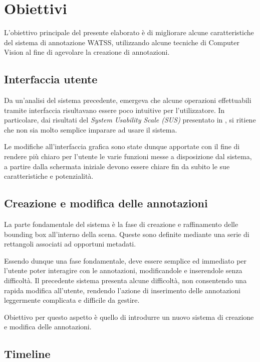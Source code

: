 \section{Obiettivi}

L'obiettivo principale del presente elaborato è di migliorare alcune caratteristiche del sistema di annotazione WATSS, utilizzando alcune tecniche di Computer Vision al fine di agevolare la creazione di annotazioni.

\subsection{Interfaccia utente}

Da un'analisi del sistema precedente, emergeva che alcune operazioni effettuabili tramite interfaccia risultavano essere poco intuitive per l'utilizzatore. In particolare, dai risultati del \emph{System Usability Scale (SUS)} presentato in \cite{Bartoli:2015:WWA:2733373.2807411}, si ritiene che non sia molto semplice imparare ad usare il sistema.

Le modifiche all'interfaccia grafica sono state dunque apportate con il fine di rendere più chiaro per l'utente le varie funzioni messe a disposizione dal sistema, a partire dalla schermata iniziale devono essere chiare fin da subito le sue caratteristiche e potenzialità.

\subsection{Creazione e modifica delle annotazioni}

La parte fondamentale del sistema è la fase di creazione e raffinamento delle bounding box all'interno della scena. Queste sono definite mediante una serie di rettangoli associati ad opportuni metadati. 

Essendo dunque una fase fondamentale, deve essere semplice ed immediato per l'utente poter interagire con le annotazioni, modificandole e inserendole senza difficoltà. Il precedente sistema presenta alcune difficoltà, non consentendo una rapida modifica all'utente, rendendo l'azione di inserimento delle annotazioni leggermente complicata e difficile da gestire.

Obiettivo per questo aspetto è quello di introdurre un nuovo sistema di creazione e modifica delle annotazioni.

\subsection{Timeline}

